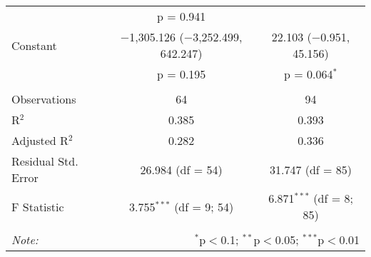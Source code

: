 \begin{table}[!htbp]
\begin{tabular}{@{\extracolsep{5pt}}lcc}
  & p = 0.941 &  \\ 
  Constant & $-$1,305.126 ($-$3,252.499, 642.247) & 22.103 ($-$0.951, 45.156) \\ 
  & p = 0.195 & p = 0.064$^{*}$ \\ 
 \hline \\[-1.8ex] 
Observations & 64 & 94 \\ 
R$^{2}$ & 0.385 & 0.393 \\ 
Adjusted R$^{2}$ & 0.282 & 0.336 \\ 
Residual Std. Error & 26.984 (df = 54) & 31.747 (df = 85) \\ 
F Statistic & 3.755$^{***}$ (df = 9; 54) & 6.871$^{***}$ (df = 8; 85) \\ 
\hline 
\hline \\[-1.8ex] 
\textit{Note:}  & \multicolumn{2}{r}{$^{*}$p$<$0.1; $^{**}$p$<$0.05; $^{***}$p$<$0.01} \\ 
\end{tabular} 
\end{table} 
